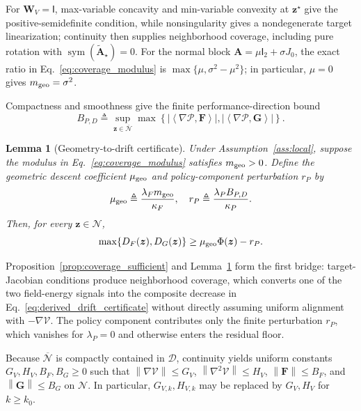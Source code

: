 \documentclass{article}
\newtheorem{lemma}{Lemma}
\theoremstyle{remark}
\newcommand{\inner}[2]{\left\langle #1,#2\right\rangle}
\newcommand{\norm}[1]{\left\lVert #1\right\rVert}
\newcommand{\Id}{\mathsf{I}}
\newcommand{\sym}{\operatorname{sym}}
\newcommand{\cD}{\mathcal{D}}
\newcommand{\cN}{\mathcal{N}}
\newcommand{\bz}{\boldsymbol{z}}
\newcommand{\bW}{\boldsymbol{W}}
\newcommand{\bA}{\boldsymbol{A}}
\newcommand{\bF}{\boldsymbol{F}}
\newcommand{\bG}{\boldsymbol{G}}
\newcommand{\Vk}{\mathcal{V}}
\newcommand{\cP}{\mathcal{P}}
\begin{document}
For $\bW_V=\Id$, max-variable concavity and min-variable convexity at $\bz^\star$ give the positive-semidefinite condition, while nonsingularity gives a nondegenerate target linearization; continuity then supplies neighborhood coverage, including pure rotation with $\sym(\widetilde{\bA}_\star)=0$.
For the normal block $\bA=\mu\Id_2+\sigma J_0$, the exact ratio in Eq.~\eqref{eq:coverage_modulus} is $\max\{\mu,\sigma^2-\mu^2\}$; in particular, $\mu=0$ gives $m_{\rm geo}=\sigma^2$.

Compactness and smoothness give the finite performance-direction bound
\[
B_{P,D}
\triangleq
\sup_{\bz\in\overline{\cN}}
\max\!\left\{
\left|\inner{\nabla\cP}{\bF}\right|,
\left|\inner{\nabla\cP}{\bG}\right|
\right\}.
\]

\begin{lemma}[Geometry-to-drift certificate]\label{lem:geometry_certificate}
Under Assumption~\ref{ass:local}, suppose the modulus in Eq.~\eqref{eq:coverage_modulus} satisfies $m_{\rm geo}>0$.
Define the geometric descent coefficient $\mu_{\rm geo}$ and policy-component perturbation $r_P$ by
\[
\mu_{\rm geo}\triangleq\frac{\lambda_Fm_{\rm geo}}{\kappa_F},
\quad
r_P\triangleq\frac{\lambda_PB_{P,D}}{\kappa_P}.
\]
Then, for every $\bz\in\cN$,
\begin{equation}\label{eq:derived_drift_certificate}
\max\{D_F(\bz),D_G(\bz)\}
\ge
\mu_{\rm geo}\Phi(\bz)-r_P.
\end{equation}
\end{lemma}

Proposition~\ref{prop:coverage_sufficient} and Lemma~\ref{lem:geometry_certificate} form the first bridge: target-Jacobian conditions produce neighborhood coverage, which converts one of the two field-energy signals into the composite decrease in Eq.~\eqref{eq:derived_drift_certificate} without directly assuming uniform alignment with $-\nabla\Vk$.
The policy component contributes only the finite perturbation $r_P$, which vanishes for $\lambda_P=0$ and otherwise enters the residual floor.

Because $\overline{\cN}$ is compactly contained in $\cD$, continuity yields uniform constants $G_V,H_V,B_F,B_G\ge0$ such that $\norm{\nabla\Vk}\le G_V$, $\norm{\nabla^2\Vk}\le H_V$, $\norm{\bF}\le B_F$, and $\norm{\bG}\le B_G$ on $\cN$.
In particular, $G_{V,k},H_{V,k}$ may be replaced by $G_V,H_V$ for $k\ge k_0$.
\end{document}
